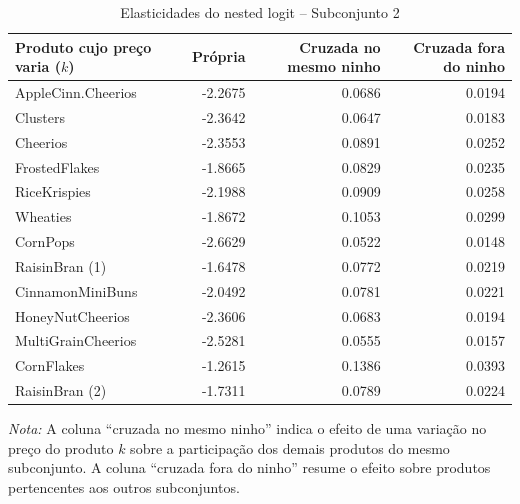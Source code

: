 
\begingroup
\begin{table}[H]
\centering
\caption{Elasticidades do nested logit -- Subconjunto 2}
\label{tab:elas-nested-subset-2}
\scriptsize
\begin{tabular}{lrrr}
\toprule
Produto cujo preço varia ($k$) 
& Própria 
& Cruzada no mesmo ninho 
& Cruzada fora do ninho \\
\midrule
AppleCinn.Cheerios & -2.2675 & 0.0686 & 0.0194 \\
Clusters & -2.3642 & 0.0647 & 0.0183 \\
Cheerios & -2.3553 & 0.0891 & 0.0252 \\
FrostedFlakes & -1.8665 & 0.0829 & 0.0235 \\
RiceKrispies & -2.1988 & 0.0909 & 0.0258 \\
Wheaties & -1.8672 & 0.1053 & 0.0299 \\
CornPops & -2.6629 & 0.0522 & 0.0148 \\
RaisinBran (1) & -1.6478 & 0.0772 & 0.0219 \\
CinnamonMiniBuns & -2.0492 & 0.0781 & 0.0221 \\
HoneyNutCheerios & -2.3606 & 0.0683 & 0.0194 \\
MultiGrainCheerios & -2.5281 & 0.0555 & 0.0157 \\
CornFlakes & -1.2615 & 0.1386 & 0.0393 \\
RaisinBran (2) & -1.7311 & 0.0789 & 0.0224 \\
\bottomrule
\end{tabular}

\vspace{0.3em}
\footnotesize
\textit{Nota:} A coluna ``cruzada no mesmo ninho'' indica o efeito de uma variação no preço do produto $k$ sobre a participação dos demais produtos do mesmo subconjunto. A coluna ``cruzada fora do ninho'' resume o efeito sobre produtos pertencentes aos outros subconjuntos.
\end{table}
\endgroup



